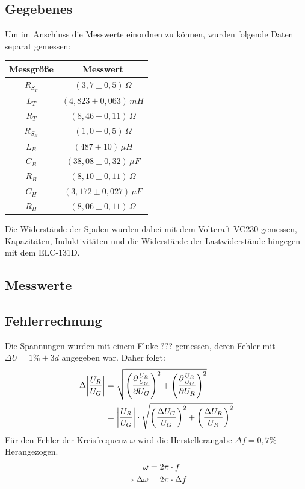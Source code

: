 \subsection{Gegebenes}
Um im Anschluss die Messwerte einordnen zu können, wurden folgende Daten separat gemessen:
\begin{center}
\begin{tabular}{c|c}
Messgröße & Messwert\\\hline
\(R_{S_T}\) & \(\left(3,7 \pm 0,5 \right)\, \Omega \) \\
\(L_T\) & \((4,823\pm 0,063)\, mH \) \\
\(R_T\) & \((8,46\pm 0,11)\, \Omega \) \\
\(R_{S_B}\) & \(\left(1,0 \pm 0,5 \right)\, \Omega \) \\
\(L_B\) & \((487\pm 10)\, \mu H \) \\
\(C_B\) & \((38,08\pm 0,32)\, \mu F \) \\
\(R_B\) & \((8,10\pm 0,11)\, \Omega \) \\
\(C_H\) & \((3,172\pm 0,027)\, \mu F \) \\
\(R_H\) & \((8,06\pm 0,11)\, \Omega \) \\
\end{tabular}
%
\end{center}
Die Widerstände der Spulen wurden dabei mit dem Voltcraft VC230 gemessen, Kapazitäten, Induktivitäten und die Widerstände der Lastwiderstände hingegen mit dem ELC-131D.
\subsection{Messwerte}
\begin{center}

\end{center}
\subsection{Fehlerrechnung}
Die Spannungen wurden mit einem Fluke ??? gemessen, deren Fehler mit \(\Delta U = 1\% +3d\) angegeben war. Daher folgt:
\begin{align}
\Delta \bigg\vert \frac{U_R}{U_G} \bigg\vert &= \sqrt{
\left( \frac{\partial \frac{U_R}{U_G}}{\partial U_G} \right)^2 +
\left( \frac{\partial \frac{U_R}{U_G}}{\partial U_R} \right)^2
}\notag\\
&= \bigg\vert \frac{U_R}{U_G} \bigg\vert \cdot \sqrt{
\left( \frac{\Delta U_G}{U_G} \right)^2 +
\left( \frac{\Delta U_R}{U_R}\right)^2
}
\end{align}
Für den Fehler der Kreisfrequenz \(\omega\) wird die Herstellerangabe \(\Delta f = 0,7 \% \) Herangezogen.
\begin{align}
\omega &= 2 \pi \cdot f\notag\\
\Rightarrow \Delta \omega &= 2 \pi \cdot \Delta f
\end{align}
